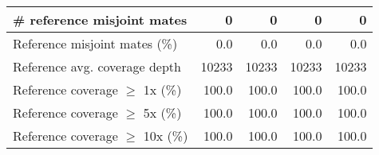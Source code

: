 \documentclass[12pt,a4paper]{article}
\begin{document}
\begin{table}[ht]
\begin{center}
\begin{tabular}{|l*{4}{|r}|}
\# reference misjoint mates & 0 & 0 & 0 & 0 \\ \hline
Reference misjoint mates (\%) & 0.0 & 0.0 & 0.0 & 0.0 \\ \hline
Reference avg. coverage depth & 10233 & 10233 & 10233 & 10233 \\ \hline
Reference coverage $\geq$ 1x (\%) & 100.0 & 100.0 & 100.0 & 100.0 \\ \hline
Reference coverage $\geq$ 5x (\%) & 100.0 & 100.0 & 100.0 & 100.0 \\ \hline
Reference coverage $\geq$ 10x (\%) & 100.0 & 100.0 & 100.0 & 100.0 \\ \hline
\end{tabular}
\end{center}
\end{table}
\end{document}
